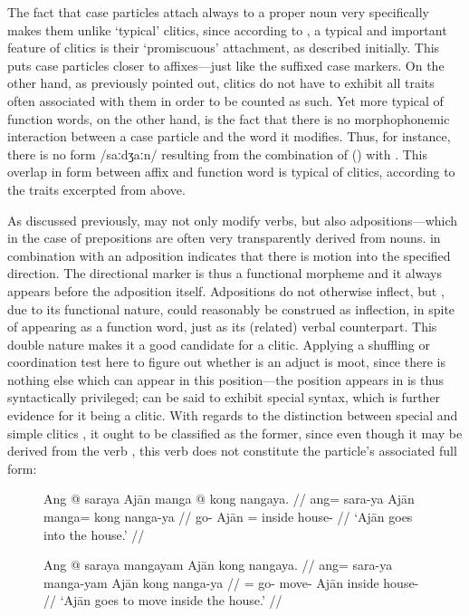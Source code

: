The fact that case particles attach always to a proper noun very specifically
makes them unlike `typical' clitics, since according to
\citet{spencerluis2012}, a typical and important feature of clitics is their
`promiscuous' attachment, as described initially. This puts case particles
closer to affixes---just like the suffixed case markers. On the other hand, as
previously pointed out, clitics do not have to exhibit all traits often
associated with them in order to be counted as such. Yet more typical of
function words, on the other hand, is the fact that there is no morphophonemic
interaction between a case particle and the word it modifies. Thus, for
instance, there is no form /saːdʒaːn/ resulting from the combination of
 (\Parg{}) with . This overlap in form between
affix and function word is typical of clitics, according to the traits
excerpted from \citet{spencerluis2012} above.

\label{clitics_prep_dyn}
As discussed previously,  may not only modify verbs, but also
ad\-posi\-tions---which in the case of prepositions are often very
transparently derived from nouns.  in combination with an
adposition indicates that there is motion into the
specified direction. The directional marker  is thus a
functional morpheme and it always appears before the adposition itself.
Adpositions do not otherwise inflect, but , due to its
functional nature, could reasonably be construed as inflection, in spite of
appearing as a function word, just as its (related) verbal counterpart. This
double nature makes it a good candidate for a clitic. Applying a shuffling or
coordination test here to figure out whether  is an adjuct is
moot, since there is nothing else which can appear in this position---the
position  appears in is thus syntactically privileged;
 can be said to exhibit special syntax, which is further
evidence for it being a clitic. With regards to the distinction between special
and simple clitics \citep{zwicky1977}, it ought to be classified as the former,
since even though it may be derived from the verb , this
verb does not constitute the particle's associated full form:

\begin{figure}[h]
\pex\label{ex:clitics_manga}
\a\label{ex:clitics_manga1}\begingl
	\gla Ang @ saraya Ajān manga @ kong nangaya. //
	\glb ang= sara-ya Ajān manga= kong nanga-ya //
	\glc \AgtT{} go-\TsgM{} Ajān \Dir{}= inside house-\Loc{} //
	\glft `Ajān goes into the house.' //
\endgl

\a\label{ex:clitics_manga2}\ljudge{\excl}\begingl
\gla Ang @ saraya mangayam Ajān kong nangaya. //
	\glb ang= sara-ya manga-yam Ajān kong nanga-ya //
	\glc \AgtT{}= go-\TsgM{} move-\Ptcp{} Ajān inside house-\Loc{} //
	\glft `Ajān goes to move inside the house.' //
\endgl
\xe
\end{figure}

